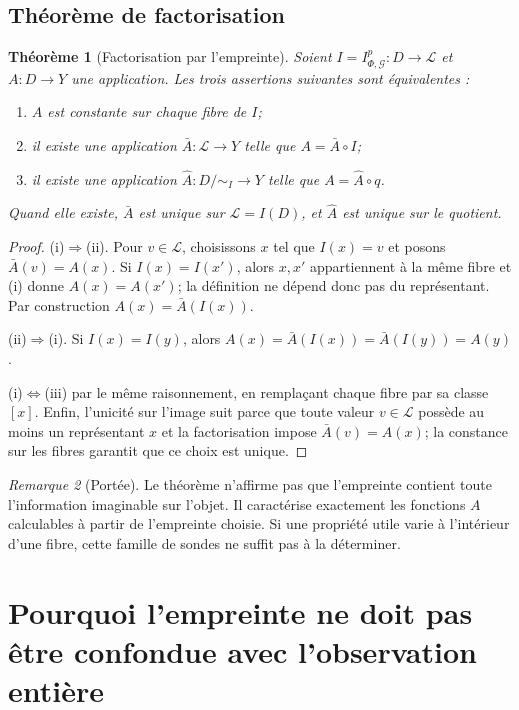 \documentclass[11pt,oneside]{book}
\newtheorem{theoreme}{Théorème}[chapter]
\theoremstyle{definition}
\theoremstyle{remark}
\newtheorem{remarque}[theoreme]{Remarque}
\newcommand{\Gcal}{\mathcal G}
\newcommand{\Lcal}{\mathcal L}
\newcommand{\1}{\mathbf 1}
\begin{document}
\section{Théorème de factorisation}
\begin{theoreme}[Factorisation par l'empreinte]
Soient $I=I_{\Phi,\Gcal}^{p}:D\to\Lcal$ et $A:D\to Y$ une application. Les trois assertions suivantes sont équivalentes :
\begin{enumerate}[label=(\roman*)]
\item $A$ est constante sur chaque fibre de $I$;
\item il existe une application $\bar A:\Lcal\to Y$ telle que $A=\bar A\circ I$;
\item il existe une application $\widehat A:D/{\sim_I}\to Y$ telle que $A=\widehat A\circ q$.
\end{enumerate}
Quand elle existe, $\bar A$ est unique sur $\Lcal=I(D)$, et $\widehat A$ est unique sur le quotient.
\end{theoreme}
\begin{proof}
(i)$\Rightarrow$(ii). Pour $v\in\Lcal$, choisissons $x$ tel que $I(x)=v$ et posons $\bar A(v)=A(x)$. Si $I(x)=I(x')$, alors $x,x'$ appartiennent à la même fibre et (i) donne $A(x)=A(x')$; la définition ne dépend donc pas du représentant. Par construction $A(x)=\bar A(I(x))$.

(ii)$\Rightarrow$(i). Si $I(x)=I(y)$, alors $A(x)=\bar A(I(x))=\bar A(I(y))=A(y)$.

(i)$\Leftrightarrow$(iii) par le même raisonnement, en remplaçant chaque fibre par sa classe $[x]$. Enfin, l'unicité sur l'image suit parce que toute valeur $v\in\Lcal$ possède au moins un représentant $x$ et la factorisation impose $\bar A(v)=A(x)$; la constance sur les fibres garantit que ce choix est unique.
\end{proof}

\begin{remarque}[Portée]
Le théorème n'affirme pas que l'empreinte contient toute l'information imaginable sur l'objet. Il caractérise exactement les fonctions $A$ calculables à partir de l'empreinte choisie. Si une propriété utile varie à l'intérieur d'une fibre, cette famille de sondes ne suffit pas à la déterminer.
\end{remarque}

\chapter{Pourquoi l'empreinte ne doit pas être confondue avec l'observation entière}
\end{document}

